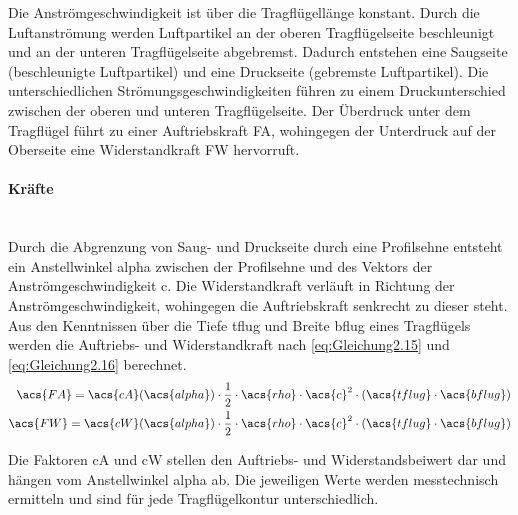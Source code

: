 Die Anströmgeschwindigkeit ist über die Tragflügellänge konstant. Durch die Luftanströmung werden Luftpartikel an der oberen Tragflügelseite beschleunigt und an der unteren Tragflügelseite abgebremst. Dadurch entstehen eine Saugseite (beschleunigte Luftpartikel) und eine Druckseite (gebremste Luftpartikel). Die unterschiedlichen Strömungsgeschwindigkeiten führen zu einem Druckunterschied zwischen der oberen und unteren Tragflügelseite. Der Überdruck unter dem Tragflügel führt zu einer Auftriebskraft \acs{FA}, wohingegen der Unterdruck auf der Oberseite eine Widerstandkraft \acs{FW} hervorruft. 

\paragraph{Kräfte}\mbox{}\smallskip\\
Durch die Abgrenzung von Saug- und Druckseite durch eine Profilsehne entsteht ein Anstellwinkel \acs{alpha} zwischen der Profilsehne und des Vektors der Anströmgeschwindigkeit \acs{c}. Die Widerstandkraft verläuft in Richtung der Anströmgeschwindigkeit, wohingegen die Auftriebskraft senkrecht zu dieser steht. Aus den Kenntnissen über die Tiefe \acs{tflug} und Breite \acs{bflug} eines Tragflügels werden die Auftriebs- und Widerstandkraft nach \autoref{eq:Gleichung2.15} und \autoref{eq:Gleichung2.16} berechnet.
\begin{align}
    \acs{FA} = \acs{cA}(\acs{alpha}) \cdot \frac{1}{2} \cdot \acs{rho} \cdot \acs{c}^2 \cdot (\acs{tflug} \cdot \acs{bflug}) \label{eq:Gleichung2.15} \\
    \acs{FW} = \acs{cW}(\acs{alpha}) \cdot \frac{1}{2} \cdot \acs{rho} \cdot \acs{c}^2 \cdot (\acs{tflug} \cdot \acs{bflug}) \label{eq:Gleichung2.16}
\end{align}

Die Faktoren \acs{cA} und \acs{cW} stellen den Auftriebs- und Widerstandsbeiwert dar und hängen vom Anstellwinkel \acs{alpha} ab. Die jeweiligen Werte werden messtechnisch ermitteln und sind für jede Tragflügelkontur unterschiedlich.

